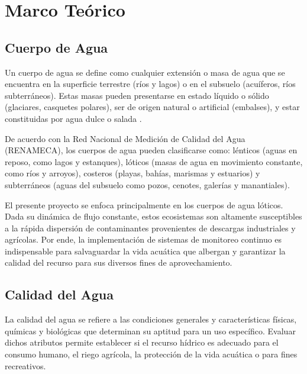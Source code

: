 \chapter{Marco Teórico}

\section{Cuerpo de Agua}
Un cuerpo de agua se define como cualquier extensión o masa de agua que se encuentra en la superficie terrestre (ríos y lagos) o en el subsuelo (acuíferos, ríos subterráneos). Estas masas pueden presentarse en estado líquido o sólido (glaciares, casquetes polares), ser de origen natural o artificial (embalses), y estar constituidas por agua dulce o salada \cite{agua2024}.

De acuerdo con la Red Nacional de Medición de Calidad del Agua (RENAMECA), los cuerpos de agua pueden clasificarse como: lénticos (aguas en reposo, como lagos y estanques), lóticos (masas de agua en movimiento constante, como ríos y arroyos), costeros (playas, bahías, marismas y estuarios) y subterráneos (aguas del subsuelo como pozos, cenotes, galerías y manantiales).

El presente proyecto se enfoca principalmente en los cuerpos de agua lóticos. Dada su dinámica de flujo constante, estos ecosistemas son altamente susceptibles a la rápida dispersión de contaminantes provenientes de descargas industriales y agrícolas. Por ende, la implementación de sistemas de monitoreo continuo es indispensable para salvaguardar la vida acuática que albergan y garantizar la calidad del recurso para sus diversos fines de aprovechamiento.

\section{Calidad del Agua}
La calidad del agua se refiere a las condiciones generales y características físicas, químicas y biológicas que determinan su aptitud para un uso específico. Evaluar dichos atributos permite establecer si el recurso hídrico es adecuado para el consumo humano, el riego agrícola, la protección de la vida acuática o para fines recreativos.

